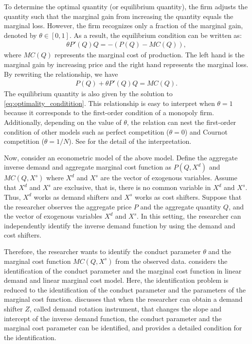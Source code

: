 \documentclass[11pt, a4paper]{article}
\theoremstyle{remark}
\begin{document}
To determine the optimal quantity (or equilibrium quantity), the firm adjusts the quantity such that the marginal gain from increasing the quantity equals the marginal loss. 
However, the firm recognizes only a fraction of the marginal gain, denoted by $\theta \in [0,1]$. 
As a result, the equilibrium condition can be written as:
\begin{align}
    \theta P'(Q)Q = - (P(Q) - MC(Q)),
\end{align}
where $MC(Q)$ represents the marginal cost of production.
The left hand is the marginal gain by increasing price and the right hand represents the marginal loss.
By rewriting the relationship, we have
\begin{align}
    P(Q)+ \theta P'(Q)Q = MC(Q). \label{eq:optimality_conditition}
\end{align}
The equilibrium quantity is also given by the solution to \eqref{eq:optimality_conditition}.
This relationship is easy to interpret when $\theta = 1$ because it corresponds to the first-order condition of a monopoly firm.
Additionally, depending on the value of $\theta$, the relation can nest the first-order condition of other models such as perfect competition ($\theta=0$) and Cournot competition ($\theta=1/N$). See \citet{adachiMicrofoundation2023} for the detail of the interpretation.


Now, consider an econometric model of the above model.
Define the aggregate inverse demand and aggregate marginal cost function as $P(Q, X^{d})$ and $MC(Q, X^{s})$ where $X^{d}$ and $X^{s}$ are the vector of exogenous variables.
Assume that $X^{d}$ and $X^{s}$ are exclusive, that is, there is no common variable in $X^{d}$ and $X^{s}$.
Thus, $X^{d}$ works as demand shifters and $X^{s}$ works as cost shifters. 
Suppose that the researcher observes the aggregate price $P$ and the aggregate quantity $Q$, and the vector of exogenous variables $X^{d}$ and $X^{s}$.
In this setting, the researcher can independently identify the inverse demand function by using the demand and cost shifters.

Therefore, the researcher wants to identify the conduct parameter $\theta$ and the marginal cost function $MC(Q, X^{s})$ from the observed data.
\cite{bresnahan1982oligopoly} considers the identification of the conduct parameter and the marginal cost function in linear demand and linear marginal cost model.
Here, the identification problem is reduced to the identification of the conduct parameter and the parameters of the marginal cost function.
\citet{bresnahan1982oligopoly} discusses that when the researcher can obtain a demand shifter $Z$, called demand rotation instrument, that changes the slope and intercept of the inverse demand function, the conduct parameter and the marginal cost parameter can be identified, and \citet{matsumura2023resolving} provides a detailed condition for the identification.
\end{document}
